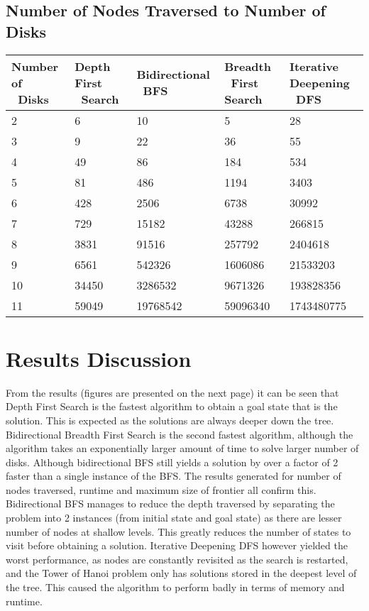 \documentclass[conference]{IEEEtran}
\begin{document}
\subsection{Number of Nodes Traversed to Number of Disks}
\begin{tabular}{ | p{0.97cm} | p{1cm} | p{1.5cm} | p{2cm} | p{1.2cm} |}
    \hline
    Number of \ Disks & Depth First \ Search & Bidirectional \ BFS & Breadth \ First Search & Iterative Deepening \ DFS \\ \hline
2 & 6 & 10 & 5 & 28 \\ \hline
3 & 9 & 22 & 36 & 55 \\ \hline
4 & 49 & 86 & 184 & 534 \\ \hline
5 & 81 & 486 & 1194 & 3403 \\ \hline
6 & 428 & 2506 & 6738 & 30992 \\ \hline
7 & 729 & 15182 & 43288 & 266815 \\ \hline
8 & 3831 & 91516 & 257792 & 2404618 \\ \hline
9 & 6561 & 542326 & 1606086 & 21533203 \\ \hline
10 & 34450 & 3286532 & 9671326 & 193828356 \\ \hline
11 & 59049 & 19768542 & 59096340 & 1743480775 \\ \hline
\end{tabular}
\fi


\section{Results Discussion}

From the results (figures are presented on the next page) it can be seen that Depth First Search is the fastest algorithm to obtain a goal state that is the solution. This is expected as the solutions are always deeper down the tree. Bidirectional Breadth First Search is the second fastest algorithm, although the algorithm takes an exponentially larger amount of time to solve larger number of disks. Although bidirectional BFS still yields a solution by over a factor of 2 faster than a single instance of the BFS. The results generated for number of nodes traversed, runtime and maximum size of frontier all confirm this. Bidirectional BFS manages to reduce the depth traversed by separating the problem into 2 instances (from initial state and goal state) as there are lesser number of nodes at shallow levels. This greatly reduces the number of states to visit before obtaining a solution. Iterative Deepening DFS however yielded the worst performance, as nodes are constantly revisited as the search is restarted, and the Tower of Hanoi problem only has solutions stored in the deepest level of the tree. This caused the algorithm to perform badly in terms of memory and runtime.
\end{document}
